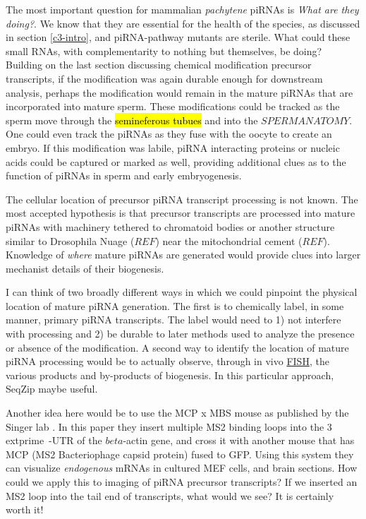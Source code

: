     The most important question for mammalian \textit{pachytene} piRNAs is \textit{What are they doing?}. We know that they are essential for the health of the species, as discussed in section \ref{c3-intro}, and piRNA-pathway mutants are sterile. What could these small RNAs, with complementarity to nothing but themselves, be doing? Building on the last section discussing chemical modification precursor transcripts, if the modification was again durable enough for downstream analysis, perhaps the modification would remain in the mature piRNAs that are incorporated into mature sperm. These modifications could be tracked as the sperm move through the \hl{semineferous tubues} and into the $SPERM ANATOMY$. One could even track the piRNAs as they fuse with the oocyte to create an embryo. If this modification was labile, piRNA interacting proteins or nucleic acids could be captured or marked as well, providing additional clues as to the function of piRNAs in sperm and early embryogenesis.

    The cellular location of precursor piRNA transcript processing is not known. The most accepted hypothesis is that precursor transcripts are processed into mature piRNAs with machinery tethered to chromatoid bodies \citep{Meikar2014} or another structure similar to Drosophila Nuage ($REF$) near the mitochondrial cement ($REF$). Knowledge of \textit{where} mature piRNAs are generated would provide clues into larger mechanist details of their biogenesis. 

    I can think of two broadly different ways in which we could pinpoint the physical location of mature piRNA generation. The first is to chemically label, in some manner, primary piRNA transcripts. The label would need to 1) not interfere with processing and 2) be durable to later methods used to analyze the presence or absence of the modification. A second way to identify the location of mature piRNA processing would be to actually observe, through in vivo \hyperref[hd:abrevs]{FISH}, the various products and by-products of biogenesis. In this particular approach, SeqZip maybe useful.

    Another idea here would be to use the MCP x MBS mouse as published by the Singer lab \citep{Park2014}. In this paper they insert multiple MS2 binding loops into the 3  extprime~-UTR of the $beta$-actin gene, and cross it with another mouse that has MCP (MS2 Bacteriophage capsid protein) fused to GFP. Using this system they can visualize   \textit{endogenous} mRNAs in cultured MEF cells, and brain sections. How could we apply this to imaging of piRNA precursor transcripts? If we inserted an MS2 loop into the tail end of transcripts, what would we see? It is certainly worth it!

